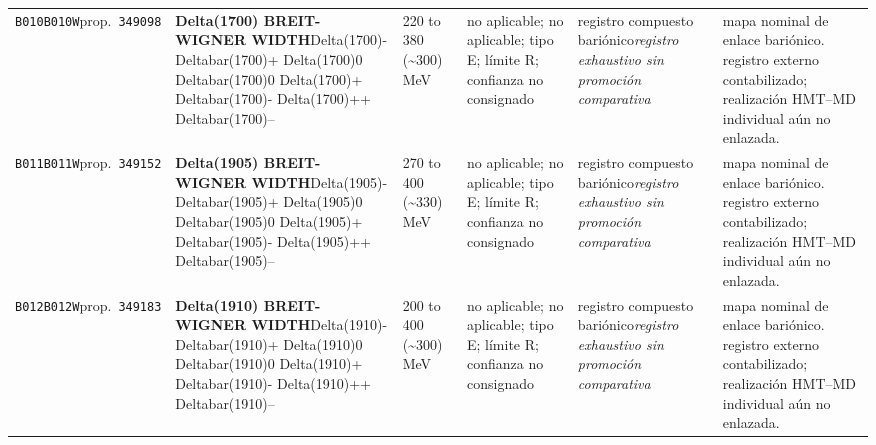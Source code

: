 \begin{landscape}
\begin{longtable}{L{1.85cm}L{4.45cm}L{2.35cm}L{4.05cm}L{3.35cm}L{7.15cm}}
\texttt{B010}\newline \texttt{B010W}\newline prop.\ \texttt{349098} & \textbf{Delta(1700) BREIT-WIGNER WIDTH}\newline Delta(1700)- \textbar{}\allowbreak{} Deltabar(1700)+ \textbar{}\allowbreak{} Delta(1700)0 \textbar{}\allowbreak{} Deltabar(1700)0 \textbar{}\allowbreak{} Delta(1700)+ \textbar{}\allowbreak{} Deltabar(1700)- \textbar{}\allowbreak{} Delta(1700)++ \textbar{}\allowbreak{} Deltabar(1700)-- & 220 to 380 (\textasciitilde{}300)\,MeV & no aplicable; no aplicable; tipo E; límite R; confianza no consignado & registro compuesto bariónico\newline \emph{registro exhaustivo sin promoción comparativa} & mapa nominal de enlace bariónico. registro externo contabilizado; realización HMT--MD individual aún no enlazada. \\
\texttt{B011}\newline \texttt{B011W}\newline prop.\ \texttt{349152} & \textbf{Delta(1905) BREIT-WIGNER WIDTH}\newline Delta(1905)- \textbar{}\allowbreak{} Deltabar(1905)+ \textbar{}\allowbreak{} Delta(1905)0 \textbar{}\allowbreak{} Deltabar(1905)0 \textbar{}\allowbreak{} Delta(1905)+ \textbar{}\allowbreak{} Deltabar(1905)- \textbar{}\allowbreak{} Delta(1905)++ \textbar{}\allowbreak{} Deltabar(1905)-- & 270 to 400 (\textasciitilde{}330)\,MeV & no aplicable; no aplicable; tipo E; límite R; confianza no consignado & registro compuesto bariónico\newline \emph{registro exhaustivo sin promoción comparativa} & mapa nominal de enlace bariónico. registro externo contabilizado; realización HMT--MD individual aún no enlazada. \\
\texttt{B012}\newline \texttt{B012W}\newline prop.\ \texttt{349183} & \textbf{Delta(1910) BREIT-WIGNER WIDTH}\newline Delta(1910)- \textbar{}\allowbreak{} Deltabar(1910)+ \textbar{}\allowbreak{} Delta(1910)0 \textbar{}\allowbreak{} Deltabar(1910)0 \textbar{}\allowbreak{} Delta(1910)+ \textbar{}\allowbreak{} Deltabar(1910)- \textbar{}\allowbreak{} Delta(1910)++ \textbar{}\allowbreak{} Deltabar(1910)-- & 200 to 400 (\textasciitilde{}300)\,MeV & no aplicable; no aplicable; tipo E; límite R; confianza no consignado & registro compuesto bariónico\newline \emph{registro exhaustivo sin promoción comparativa} & mapa nominal de enlace bariónico. registro externo contabilizado; realización HMT--MD individual aún no enlazada. \\

\end{longtable}
\end{landscape}
